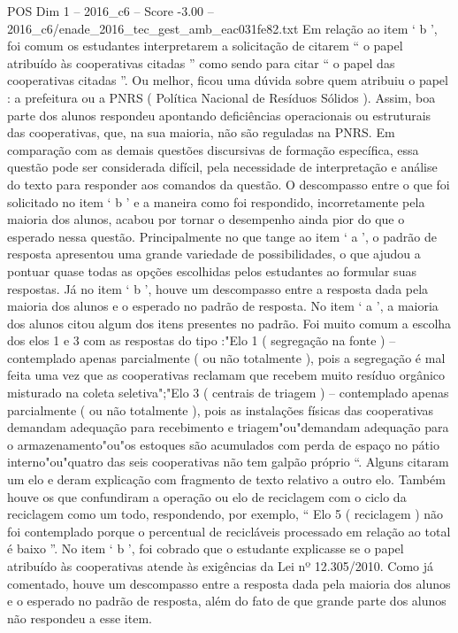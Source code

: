 \begin{textsample}{POS Dim 1 – 2016\_c6 – Score -3.00 – 2016\_c6/enade\_2016\_tec\_gest\_amb\_eac031fe82.txt}
Em relação ao item ‘ b ’, foi comum os estudantes interpretarem a solicitação de citarem “ o papel atribuído às cooperativas citadas ” como sendo para citar “ o papel das cooperativas citadas ”.
Ou melhor, ficou uma dúvida sobre quem atribuiu o papel : a prefeitura ou a PNRS ( Política Nacional de Resíduos Sólidos ).
Assim, boa parte dos alunos respondeu apontando deficiências operacionais ou estruturais das cooperativas, que, na sua maioria, não são reguladas na PNRS.
Em comparação com as demais questões discursivas de formação específica, essa questão pode ser considerada difícil, pela necessidade de interpretação e análise do texto para responder aos comandos da questão.
O descompasso entre o que foi solicitado no item ‘ b ’ e a maneira como foi respondido, incorretamente pela maioria dos alunos, acabou por tornar o desempenho ainda pior do que o esperado nessa questão.
Principalmente no que tange ao item ‘ a ’, o padrão de resposta apresentou uma grande variedade de possibilidades, o que ajudou a pontuar quase todas as opções escolhidas pelos estudantes ao formular suas respostas.
Já no item ‘ b ’, houve um descompasso entre a resposta dada pela maioria dos alunos e o esperado no padrão de resposta.
No item ‘ a ’, a maioria dos alunos citou algum dos itens presentes no padrão.
Foi muito comum a escolha dos elos 1 e 3 com as respostas do tipo :"Elo 1 ( segregação na fonte ) – contemplado apenas parcialmente ( ou não totalmente ), pois a segregação é mal feita uma vez que as cooperativas reclamam que recebem muito resíduo orgânico misturado na coleta seletiva";"Elo 3 ( centrais de triagem ) – contemplado apenas parcialmente ( ou não totalmente ), pois as instalações físicas das cooperativas demandam adequação para recebimento e triagem"ou"demandam adequação para o armazenamento"ou"os estoques são acumulados com perda de espaço no pátio interno"ou"quatro das seis cooperativas não tem galpão próprio “.
Alguns citaram um elo e deram explicação com fragmento de texto relativo a outro elo.
Também houve os que confundiram a operação ou elo de reciclagem com o ciclo da reciclagem como um todo, respondendo, por exemplo, “ Elo 5 ( reciclagem ) não foi contemplado porque o percentual de recicláveis processado em relação ao total é baixo ”.
No item ‘ b ’, foi cobrado que o estudante explicasse se o papel atribuído às cooperativas atende às exigências da Lei nº 12.305/2010.
Como já comentado, houve um descompasso entre a resposta dada pela maioria dos alunos e o esperado no padrão de resposta, além do fato de que grande parte dos alunos não respondeu a esse item.

\end{textsample}
